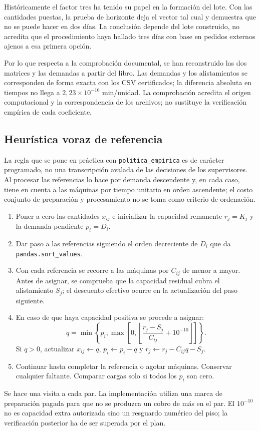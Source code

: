 Históricamente el factor tres ha tenido su papel en la formación del lote. Con las cantidades puestas, la prueba de horizonte deja el vector tal cual y demuestra que no se puede hacer en dos días. La conclusión depende del lote construido, no acredita que el procedimiento haya hallado tres días con base en pedidos externos ajenos a esa primera opción.

Por lo que respecta a la comprobación documental, se han reconstruido las dos matrices y las demandas a partir del libro. Las demandas y los alistamientos se corresponden de forma exacta con los CSV certificados; la diferencia absoluta en tiempos no llega a $2,23\times10^{-16}$ min/unidad. La comprobación acredita el origen computacional y la correspondencia de los archivos; no sustituye la verificación empírica de cada coeficiente.

\subsection{Heurística voraz de referencia}\label{an:heuristica}
La regla que se pone en práctica con \texttt{politica\_empirica} es de carácter programado, no una transcripción avalada de las decisiones de los supervisores. Al procesar las referencias lo hace por demanda descendente y, en cada caso, tiene en cuenta a las máquinas por tiempo unitario en orden ascendente; el costo conjunto de preparación y procesamiento no se toma como criterio de ordenación.

\begin{enumerate}
	\item Poner a cero las cantidades $x_{ij}$ e inicializar la capacidad remanente $r_j=K_j$ y la demanda pendiente $p_i=D_i$.
	\item Dar paso a las referencias siguiendo el orden decreciente de $D_i$ que da \texttt{pandas.sort\_values}.
	\item Con cada referencia se recorre a las máquinas por $C_{ij}$ de menor a mayor. Antes de asignar, se comprueba que la capacidad residual cubra el alistamiento $S_j$; el descuento efectivo ocurre en la actualización del paso siguiente.
	\item En caso de que haya capacidad positiva se procede a asignar:
\[
q=\min\left\{p_i,\max\left[0,\left\lfloor\frac{r_j-S_j}{C_{ij}}+10^{-10}\right\rfloor\right]\right\}.
\]
Si $q>0$, actualizar $x_{ij}\leftarrow q$, $p_i\leftarrow p_i-q$ y $r_j\leftarrow r_j-C_{ij}q-S_j$.
\item Continuar hasta completar la referencia o agotar máquinas. Conservar cualquier faltante. Comparar cargas solo si todos los $p_i$ son cero.
\end{enumerate}
Se hace una visita a cada par. La implementación utiliza una marca de preparación pagada para que no se produzca un cobro de más en el par. El $10^{-10}$ no es capacidad extra autorizada sino un resguardo numérico del piso; la verificación posterior ha de ser superada por el plan.

